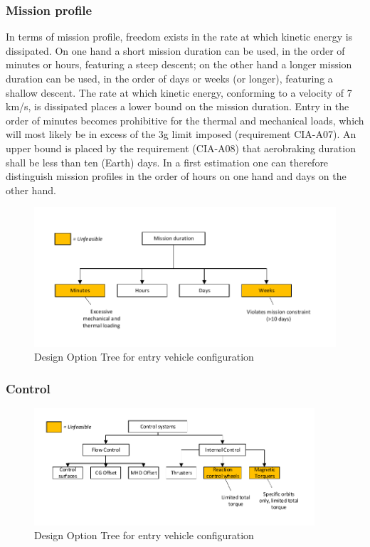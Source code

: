 \subsubsection{Mission profile} \label{sec:DOTprofile}
In terms of mission profile, freedom exists in the rate at which kinetic energy is dissipated. On one hand a short mission duration can be used, in the order of minutes or hours, featuring a steep descent; on the other hand a longer mission duration can be used, in the order of days or weeks (or longer), featuring a shallow descent. The rate at which kinetic energy, conforming to a velocity of 7 km/s, is dissipated places a lower bound on the mission duration. Entry in the order of minutes becomes prohibitive for the thermal and mechanical loads, which will most likely be in excess of the 3g limit imposed (requirement CIA-A07).  An upper bound is placed by the requirement (CIA-A08) that aerobraking duration shall be less than ten (Earth) days. In a first estimation one can therefore distinguish mission profiles in the order of hours on one hand and days on the other hand. 
\begin{figure}[H]
\centering
\includegraphics[width = 1.0\textwidth]{Figure/DOT_missionduration.pdf}
\vspace{-1cm}
\caption{Design Option Tree for entry vehicle configuration}
\label{fig:dotconfig}
\end{figure}

\subsubsection{Control} \label{sec:DOTcontrol}
\begin{figure}[H]
\centering
\includegraphics[width = 0.93\textwidth]{Figure/DOT_control.pdf}
\vspace{-1cm}
\caption{Design Option Tree for entry vehicle configuration}
\label{fig:dotconfig}
\end{figure}


